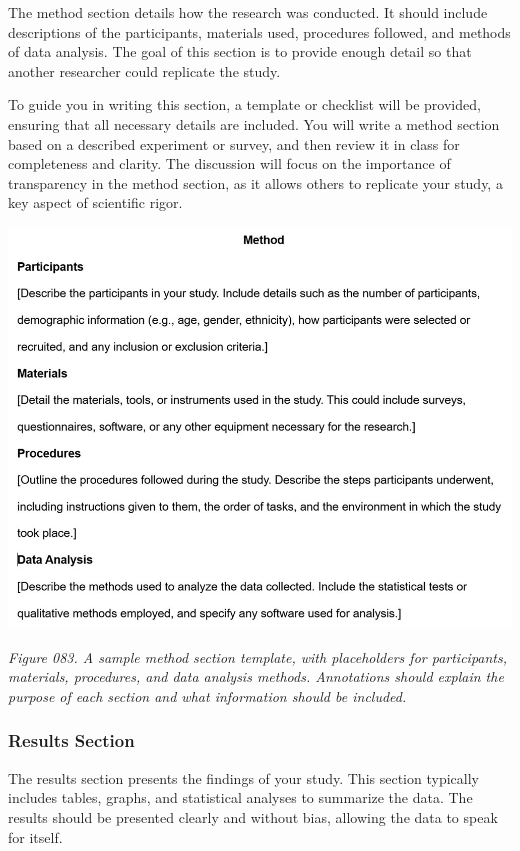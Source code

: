 \documentclass[
]{book}
\begin{document}
The method section details how the research was conducted. It should include descriptions of the participants, materials used, procedures followed, and methods of data analysis. The goal of this section is to provide enough detail so that another researcher could replicate the study.

To guide you in writing this section, a template or checklist will be provided, ensuring that all necessary details are included. You will write a method section based on a described experiment or survey, and then review it in class for completeness and clarity. The discussion will focus on the importance of transparency in the method section, as it allows others to replicate your study, a key aspect of scientific rigor.

\includegraphics[width=1\textwidth,height=\textheight]{images/fig083.jpg}

\emph{Figure 083. A sample method section template, with placeholders for participants, materials, procedures, and data analysis methods. Annotations should explain the purpose of each section and what information should be included.}

\subsubsection{Results Section}\label{results-section}

The results section presents the findings of your study. This section typically includes tables, graphs, and statistical analyses to summarize the data. The results should be presented clearly and without bias, allowing the data to speak for itself.
\end{document}
